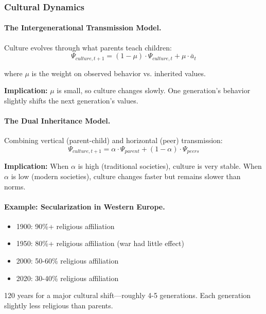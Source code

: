\documentclass[12pt,a4paper]{article}
\begin{document}
\subsubsection{Cultural Dynamics}

\paragraph{The Intergenerational Transmission Model.}
Culture evolves through what parents teach children:
\begin{equation}
  \Psi_{culture, t+1} = (1 - \mu) \cdot \Psi_{culture, t} + \mu \cdot \bar{a}_t
\end{equation}

where $\mu$ is the weight on observed behavior vs. inherited values.

\textbf{Implication:} $\mu$ is small, so culture changes slowly.
One generation's behavior slightly shifts the next generation's values.

\paragraph{The Dual Inheritance Model.}
Combining vertical (parent-child) and horizontal (peer) transmission:
\begin{equation}
  \Psi_{culture, t+1} = \alpha \cdot \Psi_{parent} + (1-\alpha) \cdot \Psi_{peers}
\end{equation}

\textbf{Implication:} When $\alpha$ is high (traditional societies), culture is very stable.
When $\alpha$ is low (modern societies), culture changes faster but remains slower than norms.

\paragraph{Example: Secularization in Western Europe.}
\begin{itemize}
  \item 1900: 90\%+ religious affiliation
  \item 1950: 80\%+ religious affiliation (war had little effect)
  \item 2000: 50-60\% religious affiliation
  \item 2020: 30-40\% religious affiliation
\end{itemize}

120 years for a major cultural shift---roughly 4-5 generations.
Each generation slightly less religious than parents.
\end{document}
